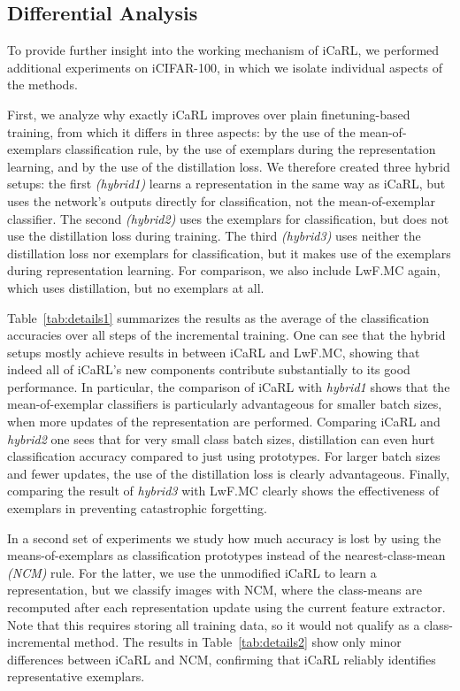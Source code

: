 \documentclass[10pt,twocolumn,letterpaper]{article}
\begin{document}
\subsection{Differential Analysis}\label{subsec:study}

To provide further insight into the working mechanism 
of iCaRL, we performed additional experiments on 
iCIFAR-100, in which we isolate individual aspects of 
the methods. 

First, we analyze why exactly iCaRL improves over plain 
finetuning-based training, from which it differs in 
three aspects: by the use of the mean-of-exemplars 
classification rule, by the use of exemplars during 
the representation learning, and by the use of the
distillation loss.
We therefore created three hybrid setups: the first 
\emph{(hybrid1)} learns a representation in the same way 
as iCaRL, but uses the network's outputs directly for 
classification, not the mean-of-exemplar classifier.
The second \emph{(hybrid2)} uses the exemplars for 
classification, but does not use the distillation 
loss during training.
The third \emph{(hybrid3)} uses neither the distillation 
loss nor exemplars for classification, but it makes use 
of the exemplars during representation learning.
For comparison, we also include LwF.MC again, which 
uses distillation, but no exemplars at all. 

Table~\ref{tab:details1} summarizes the results as the 
average of the classification accuracies over all 
steps of the incremental training.
One can see that the hybrid setups mostly achieve 
results in between iCaRL and LwF.MC, showing that 
indeed all of iCaRL's new components 
contribute substantially to its good performance. 
In particular, the comparison of iCaRL with \emph{hybrid1} shows 
that the mean-of-exemplar classifiers is particularly advantageous
for smaller batch sizes, \ie when more updates of the 
representation are performed.
Comparing iCaRL and \emph{hybrid2} one sees that for very small 
class batch sizes, distillation can even hurt classification 
accuracy compared to just using prototypes. 
For larger batch sizes and fewer updates, the use of the 
distillation loss is clearly advantageous. 
Finally, comparing the result of \emph{hybrid3} with LwF.MC 
clearly shows the effectiveness of exemplars in preventing 
catastrophic forgetting.

In a second set of experiments we study how much accuracy 
is lost by using the means-of-exemplars as classification 
prototypes instead of the nearest-class-mean \emph{(NCM)} rule.
For the latter, we use the unmodified iCaRL to learn a 
representation, but we classify images with NCM, where 
the class-means are recomputed after each representation 
update using the current feature extractor.
Note that this requires storing all training data,
so it would not qualify as a class-incremental method.
The results in Table~\ref{tab:details2} show only 
minor differences between iCaRL and NCM, confirming 
that iCaRL reliably identifies representative exemplars. 
\end{document}
